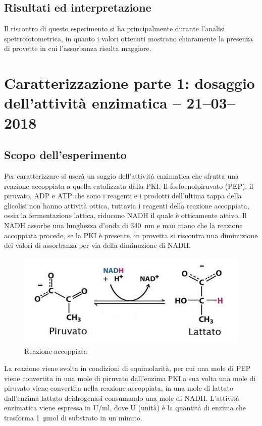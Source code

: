 \documentclass[twocolumn,a4paper,10pt]{my_report}
\begin{document}
{\subsection*{Risultati ed interpretazione}
Il riscontro di questo esperimento si ha principalmente durante l'analisi spettrofotometrica, in quanto i valori ottenuti mostrano chiaramente la presenza di provette in cui l'assorbanza risulta maggiore.

\section*{Caratterizzazione parte 1: dosaggio dell'attività enzimatica -- 21--03--2018}

\subsection*{Scopo dell'esperimento}
Per caratterizzare si userà un saggio dell'attività enzimatica che sfrutta una reazione accoppiata a quella catalizzata dalla PKI. Il fosfoenolpiruvato (PEP), il piruvato, ADP e ATP che sono i reagenti e i prodotti dell'ultima tappa della glicolisi non hanno attività ottica, tuttavia i reagenti della reazione accoppiata, ossia la fermentazione lattica, riducono NADH il quale è otticamente attivo. Il NADH assorbe una lunghezza d'onda di \SI{340}{\nano\metre} e man mano che la reazione accoppiata procede, se la PKI è presente, in provetta si riscontra una diminuzione dei valori di assorbanza per via della diminuzione di NADH.
\begin{figure}[htbp]
\centering
\includegraphics[width=0.8\linewidth]{7.jpg}
\caption{Reazione accoppiata}
\label{fig:reazione accoppiata}
\end{figure}

La reazione viene svolta in condizioni di equimolarità, per cui una mole di PEP viene convertita in una mole di piruvato dall'enzima PKI,a sua volta una mole di piruvato viene convertita nella reazione accoppiata, in una mole di lattato dall'enzima lattato deidrogenasi consumando una mole di NADH.
L’attività enzimatica viene espressa in U/ml, dove
U (unità) è la quantità di enzima che trasforma \SI{1}{\micro\mole} di substrato in un minuto.

}
\end{document}
